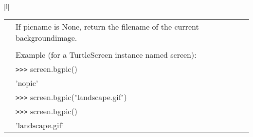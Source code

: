 \begin{center}
{\begin{tabular}{|l|}
\begin{tabular}{p{0.25in}p{4in}}
&        If picname is None, return the filename of the current backgroundimage. \\
&  \\
&        Example (for a TurtleScreen instance named screen): \\
&        \verb+>+\verb+>+\verb+>+ screen.bgpic() \\
&        'nopic' \\
&        \verb+>+\verb+>+\verb+>+ screen.bgpic("landscape.gif") \\
&        \verb+>+\verb+>+\verb+>+ screen.bgpic() \\
&        'landscape.gif' \\
\end{tabular} \\ \hline

\end{tabular}}
\end{center}
